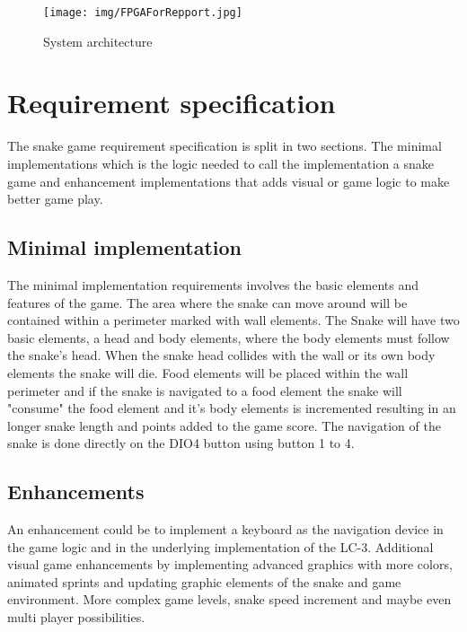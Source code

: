 \documentclass{acm_proc_article-sp}
\begin{document}
\begin{figure}[h]
\centering
\texttt{[image: img/FPGAForRepport.jpg]} 
\caption{System architecture}
\label{fig:architecture}
\end{figure}



\section{Requirement specification}
The snake game requirement specification is split in two sections. The minimal implementations which is the logic needed to call the implementation a snake game and enhancement implementations that  adds visual or game logic to make better game play. 

\subsection{Minimal implementation}
The minimal implementation requirements involves the basic elements and features of the game. The area where the snake can move around will be contained within a perimeter marked with wall elements. The Snake will have two basic elements, a head and body elements, where the body elements must follow the snake's head. When the snake head collides with the wall or its own body elements the snake will die. Food elements will be placed within the wall perimeter and if the snake is navigated to a food element the snake will "consume" the food element and it's body elements is incremented resulting in an longer snake length and points added to the game score. The navigation of the snake is done directly on the DIO4 button using button 1 to 4.  


\subsection{Enhancements}
An enhancement could be to implement a keyboard as the navigation device in the game logic and in the underlying implementation of the LC-3. 
Additional visual game enhancements by implementing advanced graphics with more colors, animated sprints and updating graphic elements of the snake and game environment. 
More complex game levels, snake speed increment and maybe even multi player possibilities. 
\end{document}
